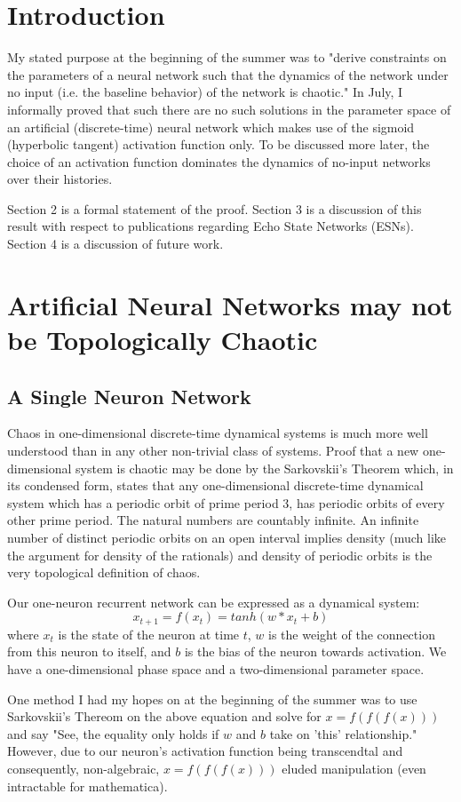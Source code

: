 \documentclass{article}
\begin{document}
\section{Introduction}
My stated purpose at the beginning of the summer was to "derive constraints 
on the
parameters of a neural network such that the dynamics of the network under
no input (i.e. the baseline behavior) of the network is chaotic."  In July,
I informally proved that such there are no such
solutions in the parameter space of an artificial (discrete-time) neural 
network which makes use of the sigmoid (hyperbolic tangent) activation function
only.  To be discussed more later, the choice of an activation function 
dominates the dynamics of no-input networks over their histories.

Section 2 is a formal statement of the proof.  Section 3 is a discussion
of this result with respect to publications regarding Echo State
Networks (ESNs).  Section 4 is a discussion of future work.

\section{Artificial Neural Networks may not be Topologically Chaotic}
\subsection{A Single Neuron Network}
Chaos in one-dimensional discrete-time dynamical systems is much more well
understood than in any other non-trivial class of systems.  Proof that
a new one-dimensional system is chaotic may be done by the Sarkovskii's Theorem
which, in its condensed form, states that any one-dimensional discrete-time dynamical system which
has a periodic orbit of prime period $3$, has periodic orbits of every other prime period.  The natural numbers are countably infinite.  An infinite number of
distinct periodic orbits on an open interval implies density (much like the argument for density of the rationals) and density of periodic orbits is the very topological definition of chaos.

Our one-neuron recurrent network can be expressed as a dynamical system:
$$x_{t+1} = f(x_{t}) = tanh(w*x_{t} + b)$$
where $x_{t}$ is the state of the neuron at time $t$, $w$ is the weight of the connection from this neuron to itself, and $b$ is the bias of the neuron towards activation.  We have a one-dimensional phase space and a two-dimensional parameter space.

One method I had my hopes on at the beginning of the summer was to use Sarkovskii's Thereom on the above equation and solve for $x = f(f(f(x)))$ and say "See, the equality only holds if $w$ and $b$ take on 'this' relationship."  
However, due to our neuron's activation function being transcendtal and
consequently, non-algebraic, $x = f(f(f(x)))$ eluded manipulation 
(even intractable for mathematica).  
\end{document}
